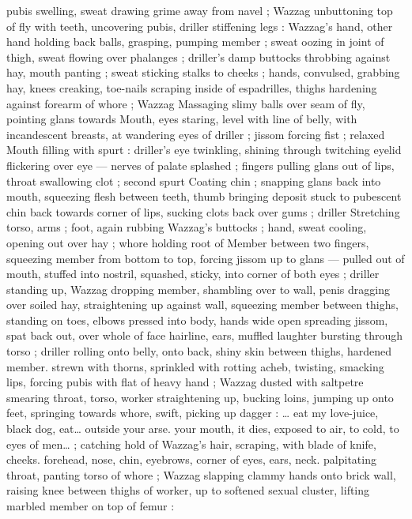 pubis swelling, sweat drawing grime away from navel ; Wazzag 
unbuttoning top of fly with teeth, uncovering pubis, driller stiffening 
legs : Wazzag's hand, other hand holding back balls, grasping, 
pumping member ; sweat oozing in joint of thigh, sweat flowing over 
phalanges ; driller's damp buttocks throbbing against hay, mouth 
panting ; sweat sticking stalks to cheeks ; hands, convulsed, 
grabbing hay, knees creaking, toe-nails scraping inside of 
espadrilles, thighs hardening against forearm of whore ; Wazzag 
Massaging slimy balls over seam of fly, pointing glans towards 
Mouth, eyes staring, level with line of belly, with incandescent 
breasts, at wandering eyes of driller ; jissom forcing fist ; relaxed 
Mouth filling with spurt : driller's eye twinkling, shining through 
twitching eyelid flickering over eye --- nerves of palate splashed ; 
fingers pulling glans out of lips, throat swallowing clot ; second spurt 
Coating chin ; snapping glans back into mouth, squeezing flesh 
between teeth, thumb bringing deposit stuck to pubescent chin back 
towards corner of lips, sucking clots back over gums ; driller 
Stretching torso, arms ; foot, again rubbing Wazzag's buttocks ; 
hand, sweat cooling, opening out over hay ; whore holding root of 
Member between two fingers, squeezing member from bottom to top, 
forcing jissom up to glans --- pulled out of mouth, stuffed into 
nostril, squashed, sticky, into corner of both eyes ; driller standing 
up, Wazzag dropping member, shambling over to wall, penis dragging 
over soiled hay, straightening up against wall, squeezing member 
between thighs, standing on toes, elbows pressed into body, hands 
wide open spreading jissom, spat back out, over whole of face 
hairline, ears, muffled laughter bursting through torso ; driller rolling 
onto belly, onto back, shiny skin between thighs, hardened member. 
strewn with thorns, sprinkled with rotting acheb, twisting, smacking 
lips, forcing pubis with flat of heavy hand ; Wazzag dusted with 
saltpetre smearing throat, torso, worker straightening up, bucking 
loins, jumping up onto feet, springing towards whore, swift, picking 
up dagger : {\gl}{\ldots} eat my love-juice, black dog, eat{\ldots} outside your arse. 
your mouth, it dies, exposed to air, to cold, to eyes of men{\ldots}{\gr} ; 
catching hold of Wazzag's hair, scraping, with blade of knife, cheeks. 
forehead, nose, chin, eyebrows, corner of eyes, ears, neck. 
palpitating throat, panting torso of whore ; Wazzag slapping clammy 
hands onto brick wall, raising knee between thighs of worker, up to 
softened sexual cluster, lifting marbled member on top of femur : 
